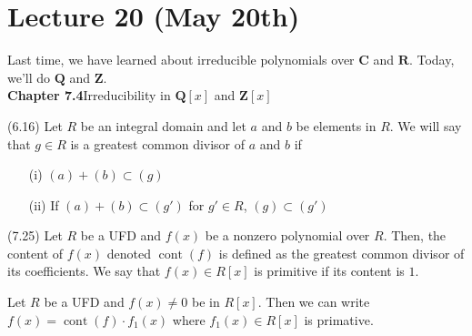\section{Lecture 20 (May 20th)}
Last time, we have learned about irreducible polynomials over ${\bm C}$ and ${\bm R}$. Today, we'll do ${\bm Q}$ and ${\bm Z}$.\\
\newline
{\bf Chapter 7.4}\hspace{2ex}Irreducibility in ${\bm Q}[x]$ and ${\bm Z}[x]$
\newline
\begin{defi}
(6.16) Let $R$ be an integral domain and let $a$ and $b$ be elements in $R$. We will say that $g\in R$ is a greatest common divisor of $a$ and $b$ if 
\begin{itemize}
\item[(i)] $(a)+(b)\subset (g)$
\item[(ii)] If $(a)+(b)\subset (g')$ for $g'\in R$, $(g)\subset (g')$
\end{itemize}
\end{defi}
\vspace{2ex}
\begin{defi}
(7.25) Let $R$ be a UFD and $f(x)$ be a nonzero polynomial over $R$. Then, the content of $f(x)$ denoted $\mathop{\mathrm{cont}}(f)$ is defined as the greatest common divisor of its coefficients. We say that $f(x)\in R[x]$ is primitive if its content is $1$. 
\end{defi}
\vspace{2ex}
\begin{rmk}
Let $R$ be a UFD and $f(x)\ne 0$ be in $R[x]$. Then we can write $f(x)=\mathop{\mathrm{cont}}(f)\cdot f_1(x)$ where $f_1(x)\in R[x]$ is primative. 
\end{rmk}


